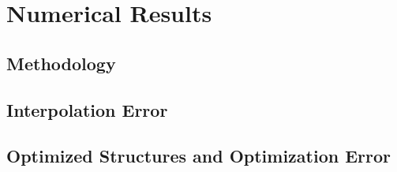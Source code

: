\section{Numerical Results}
\label{sec:64results}



\subsection{Methodology}
\label{sec:641methodology}




\dummytext[12]{}



\subsection{Interpolation Error}
\label{sec:642interpolation}

\dummytext[12]{}



\subsection{Optimized Structures and Optimization Error}
\label{sec:643optimization}

\dummytext[12]{}
